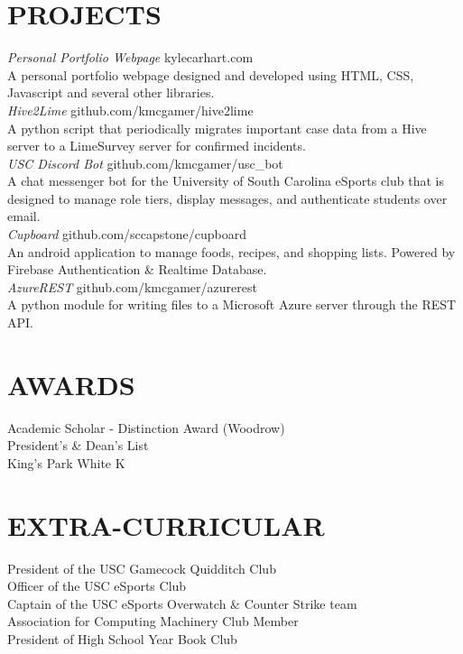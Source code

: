 \documentclass[line,margin]{res}
\begin{document}
\begin{resume}
\section{PROJECTS} {\sl Personal Portfolio Webpage} \hfill kylecarhart.com \\
				A personal portfolio webpage designed and developed using HTML, CSS, Javascript and several other libraries.\\[5pt]
				{\sl Hive2Lime} \hfill github.com/kmcgamer/hive2lime \\
				A python script that periodically migrates important case data from a Hive server to a LimeSurvey server for confirmed incidents.\\[5pt]
				{\sl USC Discord Bot} \hfill github.com/kmcgamer/usc\_bot \\
				A chat messenger bot for the University of South Carolina eSports club that is designed to manage role tiers, display messages, and authenticate students over email.\\[5pt]
				{\sl Cupboard} \hfill github.com/sccapstone/cupboard \\
				An android application to manage foods, recipes, and shopping lists. Powered by Firebase Authentication \& Realtime Database.\\[5pt]
				{\sl AzureREST} \hfill github.com/kmcgamer/azurerest \\
				A python module for writing files to a Microsoft Azure server through the REST API.
 
\section{AWARDS} Academic Scholar - Distinction Award (Woodrow) \\
				President's \& Dean's List \\  
				King's Park White K

\section{EXTRA-CURRICULAR}
				President of the USC Gamecock Quidditch Club \\
				Officer of the USC eSports Club \\
				Captain of the USC eSports Overwatch \& Counter Strike team \\
				Association for Computing Machinery Club Member \\
				President of High School Year Book Club
\end{resume}
\end{document}
